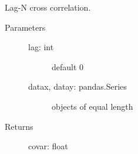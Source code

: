 \documentclass[letterpaper,10pt,english]{sphinxmanual}
\begin{document}

\begin{fulllineitems}
\label{\detokenize{code:ATom.atom_functions.crosscorr_depricated}}
Lag-N cross correlation.
\begin{description}
\item[{Parameters}] \leavevmode\begin{description}
\item[{lag: int}] \leavevmode
default 0

\item[{datax, datay: pandas.Series}] \leavevmode
objects of equal length

\end{description}

\item[{Returns}] \leavevmode
covar: float

\end{description}

\end{fulllineitems}

\end{document}

